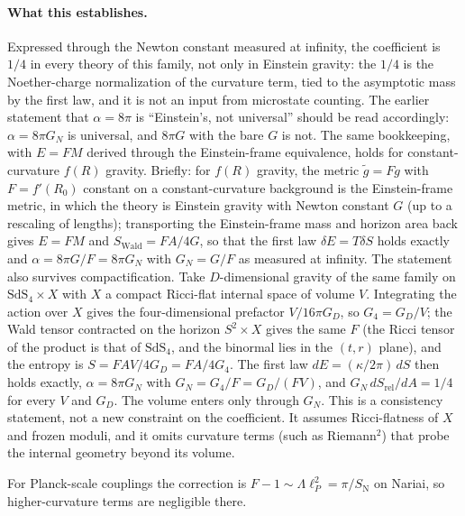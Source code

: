 \documentclass[11pt]{article}
\begin{document}
\paragraph{What this establishes.} Expressed through the Newton constant measured at infinity, the coefficient is $1/4$ in every theory of this family, not only in Einstein gravity: the $1/4$ is the Noether-charge normalization of the curvature term, tied to the asymptotic mass by the first law, and it is not an input from microstate counting. The earlier statement that $\alpha=8\pi$ is ``Einstein's, not universal'' should be read accordingly: $\alpha=8\pi G_N$ is universal, and $8\pi G$ with the bare $G$ is not. The same bookkeeping, with $E=F M$ derived through the Einstein-frame equivalence, holds for constant-curvature $f(R)$ gravity. Briefly: for $f(R)$ gravity, the metric $\tilde g=F g$ with $F=f'(R_0)$ constant on a constant-curvature background is the Einstein-frame metric, in which the theory is Einstein gravity with Newton constant $G$ (up to a rescaling of lengths); transporting the Einstein-frame mass and horizon area back gives $E=FM$ and $S_{\mathrm{Wald}}=FA/4G$, so that the first law $\delta E=T\delta S$ holds exactly and $\alpha=8\pi G/F=8\pi G_N$ with $G_N=G/F$ as measured at infinity. The statement also survives compactification. Take $D$-dimensional gravity of the same family on $\mathrm{SdS}_4\times X$ with $X$ a compact Ricci-flat internal space of volume $V$. Integrating the action over $X$ gives the four-dimensional prefactor $V/16\pi G_D$, so $G_4=G_D/V$; the Wald tensor contracted on the horizon $S^2\times X$ gives the same $F$ (the Ricci tensor of the product is that of $\mathrm{SdS}_4$, and the binormal lies in the $(t,r)$ plane), and the entropy is $S=FAV/4G_D=FA/4G_4$. The first law $dE=(\kappa/2\pi)\,dS$ then holds exactly, $\alpha=8\pi G_N$ with $G_N=G_4/F=G_D/(FV)$, and $G_N\,dS_{\mathrm{rel}}/dA=1/4$ for every $V$ and $G_D$. The volume enters only through $G_N$. This is a consistency statement, not a new constraint on the coefficient. It assumes Ricci-flatness of $X$ and frozen moduli, and it omits curvature terms (such as Riemann$^2$) that probe the internal geometry beyond its volume.

For Planck-scale couplings the correction is $F-1\sim\Lambda\ell_P^2=\pi/S_{\mathrm N}$ on Nariai, so higher-curvature terms are negligible there.
\end{document}
